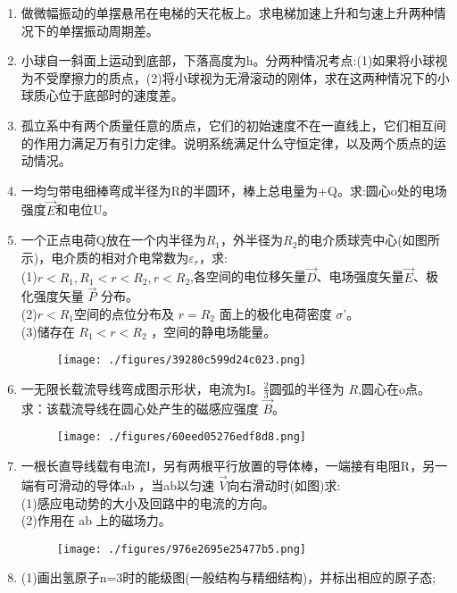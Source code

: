 
\begin{enumerate}
\item 做微幅振动的单摆悬吊在电梯的天花板上。求电梯加速上升和匀速上升两种情况下的单摆振动周期差。
\item 小球自一斜面上运动到底部，下落高度为h。分两种情况考点:(1)如果将小球视为不受摩擦力的质点，(2)将小球视为无滑滚动的刚体，求在这两种情况下的小球质心位于底部时的速度差。
\item 孤立系中有两个质量任意的质点，它们的初始速度不在一直线上，它们相互间的作用力满足万有引力定律。说明系统满足什么守恒定律，以及两个质点的运动情况。
\item 一均匀带电细棒弯成半径为R的半圆环，棒上总电量为+Q。求:圆心o处的电场强度$\vec E$和电位U。
\item 一个正点电荷Q放在一个内半径为$R_1$，外半径为$R_2$的电介质球壳中心(如图所示)，电介质的相对介电常数为$\varepsilon_r$，求:\\
(1)$r<R_1,R_1<r<R_2,r<R_2$,各空间的电位移矢量$\vec D$、电场强度矢量$\vec{E}$、极化强度矢量 $\vec P$ 分布。\\
(2)$r<R_1$空间的点位分布及 $r=R_2$ 面上的极化电荷密度 $\sigma$'。\\
(3)储存在 $R_1<r<R_2$ ，空间的静电场能量。
\begin{figure}[ht]
\centering
\texttt{[image: ./figures/39280c599d24c023.png]}
\caption{} \label{fig_SSD103_2}
\end{figure}
\item 一无限长载流导线弯成图示形状，电流为I。$\frac{2}{3}$圆弧的半径为 $R$,圆心在o点。求：该载流导线在圆心处产生的磁感应强度 $\vec B$。
\begin{figure}[ht]
\centering
\texttt{[image: ./figures/60eed05276edf8d8.png]}
\caption{} \label{fig_SSD103_3}
\end{figure}
\item 一根长直导线载有电流I，另有两根平行放置的导体棒，一端接有电阻R，另一端有可滑动的导体ab ，当ab以匀速 $\vec V$向右滑动时(如图)求:\\
(1)感应电动势的大小及回路中的电流的方向。\\
(2)作用在 ab 上的磁场力。
\begin{figure}[ht]
\centering
\texttt{[image: ./figures/976e2695e25477b5.png]}
\caption{} \label{fig_SSD103_5}
\end{figure}
\item (1)画出氢原子n=3时的能级图(一般结构与精细结构)，并标出相应的原子态;\\

\end{enumerate}
